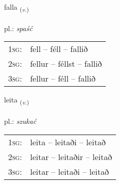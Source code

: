 \documentclass[frontgrid, backgrid]{flacards}\usepackage[]{graphicx}\usepackage[]{xcolor}
\begin{document}
\renewcommand{\flhead}{\vskip5pt \fboxsep=0pt {\small\bfseries\footnotesize Sagnorð | czasownik}}
\renewcommand{\fcfoot}{\vskip5pt \fboxsep=0pt \hspace{2pt}{\small\bfseries\footnotesize 1K}}

\renewcommand{\blhead}{\vskip5pt {\small\bfseries\footnotesize Sagnorð | czasownik }}
\renewcommand{\bcfoot}{\vskip5pt \hspace{2pt}{\small\bfseries\footnotesize 1K}}


{falla \small{\textsubscript{(\textit{v.})}} \\[1ex] %
\textphonetic{[fatla]} \\
pl.: \emph{spaść} \\  [2ex]
\renewcommand*{\arraystretch}{0.8}
\begin{tabular}{p{1cm}l}
\textsc{1sg}: & fell -- féll -- fallið \\ 
\textsc{2sg}: & fellur -- féllst -- fallið \\ 
\textsc{3sg}: & fellur -- féll -- fallið \\ 
\end{tabular}
}

\renewcommand{\flhead}{\vskip5pt \fboxsep=0pt {\small\bfseries\footnotesize Sagnorð | czasownik}}
\renewcommand{\fcfoot}{\vskip5pt \fboxsep=0pt \hspace{2pt}{\small\bfseries\footnotesize 1K}}

\renewcommand{\blhead}{\vskip5pt {\small\bfseries\footnotesize Sagnorð | czasownik }}
\renewcommand{\bcfoot}{\vskip5pt \hspace{2pt}{\small\bfseries\footnotesize 1K}}


{leita \small{\textsubscript{(\textit{v.})}} \\[1ex] %
\textphonetic{[leiːta]} \\
pl.: \emph{szukać} \\  [2ex]
\renewcommand*{\arraystretch}{0.8}
\begin{tabular}{p{1cm}l}
\textsc{1sg}: & leita -- leitaði -- leitað \\ 
\textsc{2sg}: & leitar -- leitaðir -- leitað \\ 
\textsc{3sg}: & leitar -- leitaði -- leitað \\ 
\end{tabular}
}
\end{document}
